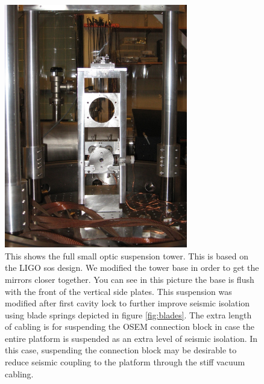 

\begin{figure}
\centering
  \includegraphics[width=8cm]{./figures/susbig.jpg}
  \caption[Small Optic Suspension]{This shows the full small optic suspension
  tower.
  This is based on the LIGO \ac{sos} design.
  We modified the tower base in order to get the mirrors closer together.
  You can see in this picture the base is flush with the front of the
  vertical side plates.
  This suspension was modified after first cavity lock to further improve
  seismic isolation using blade springs depicted in figure \ref{fig:blades}.
  The extra length of cabling is for suspending the OSEM connection block
  in case the entire platform is suspended as an extra level of seismic
  isolation.
  In this case, suspending the connection block may be desirable to reduce
  seismic coupling to the platform through the stiff vacuum cabling.
  }
  \label{fig:susbig}
\end{figure}

